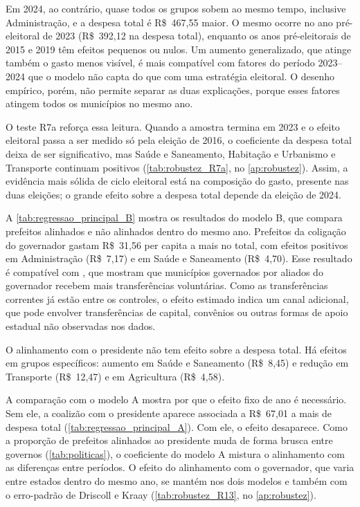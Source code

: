 Em 2024, ao contrário, quase todos os grupos sobem ao mesmo tempo, inclusive Administração, e a despesa total é R\$~467,55 maior. O mesmo ocorre no ano pré-eleitoral de 2023 (R\$~392,12 na despesa total), enquanto os anos pré-eleitorais de 2015 e 2019 têm efeitos pequenos ou nulos. Um aumento generalizado, que atinge também o gasto menos visível, é mais compatível com fatores do período 2023--2024 que o modelo não capta do que com uma estratégia eleitoral. O desenho empírico, porém, não permite separar as duas explicações, porque esses fatores atingem todos os municípios no mesmo ano.

O teste R7a reforça essa leitura. Quando a amostra termina em 2023 e o efeito eleitoral passa a ser medido só pela eleição de 2016, o coeficiente da despesa total deixa de ser significativo, mas Saúde e Saneamento, Habitação e Urbanismo e Transporte continuam positivos (\autoref{tab:robustez_R7a}, no \autoref{ap:robustez}). Assim, a evidência mais sólida de ciclo eleitoral está na composição do gasto, presente nas duas eleições; o grande efeito sobre a despesa total depende da eleição de 2024.

A \autoref{tab:regressao_principal_B} mostra os resultados do modelo B, que compara prefeitos alinhados e não alinhados dentro do mesmo ano. Prefeitos da coligação do governador gastam R\$~31,56 per capita a mais no total, com efeitos positivos em Administração (R\$~7,17) e em Saúde e Saneamento (R\$~4,70). Esse resultado é compatível com \textcite{ferreira2007}, que mostram que municípios governados por aliados do governador recebem mais transferências voluntárias. Como as transferências correntes já estão entre os controles, o efeito estimado indica um canal adicional, que pode envolver transferências de capital, convênios ou outras formas de apoio estadual não observadas nos dados.

O alinhamento com o presidente não tem efeito sobre a despesa total. Há efeitos em grupos específicos: aumento em Saúde e Saneamento (R\$~8,45) e redução em Transporte (R\$~12,47) e em Agricultura (R\$~4,58).

A comparação com o modelo A mostra por que o efeito fixo de ano é necessário. Sem ele, a coalizão com o presidente aparece associada a R\$~67,01 a mais de despesa total (\autoref{tab:regressao_principal_A}). Com ele, o efeito desaparece. Como a proporção de prefeitos alinhados ao presidente muda de forma brusca entre governos (\autoref{tab:politicas}), o coeficiente do modelo A mistura o alinhamento com as diferenças entre períodos. O efeito do alinhamento com o governador, que varia entre estados dentro do mesmo ano, se mantém nos dois modelos e também com o erro-padrão de Driscoll e Kraay (\autoref{tab:robustez_R13}, no \autoref{ap:robustez}).


